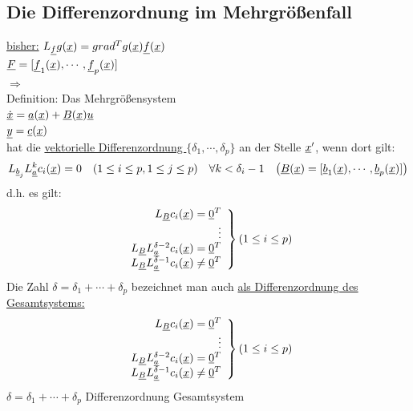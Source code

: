 \documentclass[openany,a4paper,11pt]{book}
\begin{document}
\subsection{Die Differenzordnung im Mehrgrößenfall}
\uline{bisher:} $L_{\uline{f}}g(\uline{x})=grad^Tg(\uline{x})\uline{f}(\uline{x})$\\
$\uline{F}=[\uline{f}_1(\uline{x}),\cdots,\uline{f}_p(\uline{x})]$\\
$\Rightarrow$ \\
Definition: Das Mehrgrößensystem\\ $\uline{\dot{x}}=\uline{a}(\uline{x})+\uline{B}(\uline{x})\uline{u}$\\
$\uline{y}=\uline{c}(\uline{x})$\\
hat die \uline{vektorielle Differenzordnung $\{\delta_1,\cdots,\delta_p\}$} an der Stelle $\uline{x}'$, wenn dort gilt:
\[L_{\uline{b}_j}L_{\uline{a}}^k c_i(\uline{x})=0 \quad (1\le i\le p, 1\le j\le p) \quad \forall k<\delta_i-1 \quad \big(\uline{B}(\uline{x})=[\uline{b}_1(\uline{x}),\cdots,\uline{b}_p(\uline{x})]\big)\]
d.h. es gilt:\\
\[\left.
\begin{array}{r}
L_{\uline{B}}c_i(\uline{x})=\uline{0}^T\\
\vdots\\
L_{\uline{B}}L_{\uline{a}}^{\delta-2}c_i(\uline{x})=\uline{0}^T\\
L_{\uline{B}}L_{\uline{a}}^{\delta-1}c_i(\uline{x})\ne\uline{0}^T\\
\end{array}
\right\} (1\le i\le p)\]
Die Zahl $\delta=\delta_1+\cdots+\delta_p$ bezeichnet man auch \uline{als Differenzordnung des Gesamtsystems:}\\
\[\left.
\begin{array}{r}
L_{\uline{B}}c_i(\uline{x})=\uline{0}^T\\
\vdots\\
L_{\uline{B}}L_{\uline{a}}^{\delta-2}c_i(\uline{x})=\uline{0}^T\\
L_{\uline{B}}L_{\uline{a}}^{\delta-1}c_i(\uline{x})\ne\uline{0}^T\\
\end{array}
\right\} (1\le i\le p)\]
$\delta=\delta_1+\cdots+\delta_p$ Differenzordnung Gesamtsystem 
\end{document}
